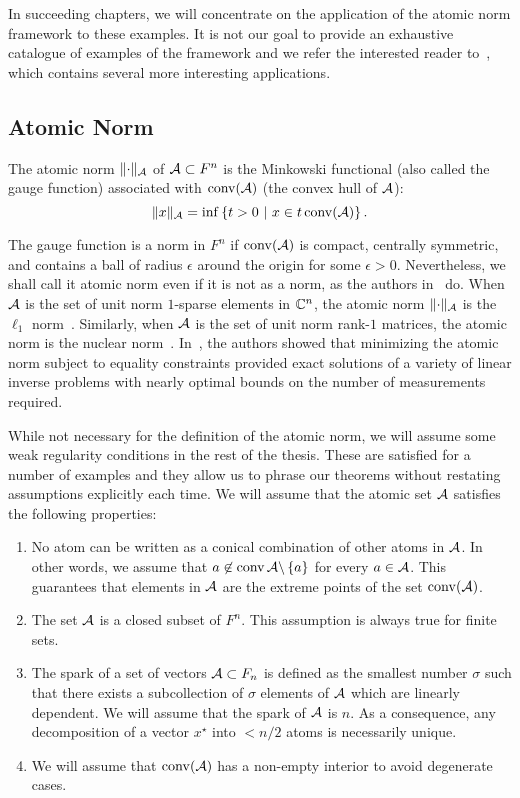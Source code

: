 In succeeding chapters, we will concentrate on the application of the atomic
norm framework to these examples. It is not our goal to provide an exhaustive
catalogue of examples of the framework and we refer the interested reader
to~\cite{crpw}, which contains several more interesting applications.

\subsection{Atomic Norm}

\begin{definition}
The atomic norm $\lVert\cdot\rVert_{\mathcal{A}}$ of $\mathcal{A} \subset F^n$ is the Minkowski
functional (also called the gauge function) associated with $\operatorname{conv}(\mathcal{A})$ (the
convex hull of $\mathcal{A}$):
\begin{equation}
	\label{defatnorm} \lVert x\rVert_{\mathcal{A}} = \inf\left\{t > 0 ~\middle|~ x \in t \operatorname{conv}(\mathcal{A}) \right\}. 
\end{equation}
\end{definition}

The gauge function is a norm in $F^n$ if $\operatorname{conv}(\mathcal{A})$ is compact, centrally
symmetric, and contains a ball of radius $\epsilon$ around the origin for some
$\epsilon>0$. Nevertheless, we shall call it atomic norm even if it is not as a
norm, as the authors in~\cite{crpw} do. When $\mathcal{A}$ is the set of unit norm
$1$-sparse elements in $\mathbb{C}^n$, the atomic norm $\lVert\cdot\rVert_{\mathcal{A}}$ is the
$\ell_1$ norm~\cite{candes06}. Similarly, when $\mathcal{A}$ is the set of unit norm
rank-$1$ matrices, the atomic norm is the nuclear norm~\cite{Recht10}.
In~\cite{crpw}, the authors showed that minimizing the atomic norm subject to
equality constraints provided exact solutions of a variety of linear inverse
problems with nearly optimal bounds on the number of measurements required.

While not necessary for the definition of the atomic norm, we will assume some
weak regularity conditions in the rest of the thesis. These are satisfied for a
number of examples and they allow us to phrase our theorems without restating
assumptions explicitly each time. We will assume that the atomic set $\mathcal{A}$ satisfies the following properties:
\begin{enumerate}
	\item No atom can be written as a conical combination of other atoms in 		$\mathcal{A}$. In other words, we assume that $ a \not\in \operatorname{conv}{\mathcal{A} \backslash \left\{ a \right\}}$ for every $a \in \mathcal{A}$. This guarantees that elements in $\mathcal{A}$ are the extreme points of the set $\operatorname{conv}(\mathcal{A})$.
	\item The set $\mathcal{A}$ is a closed subset of $F^n$. This assumption is always true for finite sets.
	\item The spark of a set of vectors $\mathcal{A} \subset F_n$ is defined as the smallest number $\sigma$ such that there exists a subcollection of $\sigma$ elements of $\mathcal{A}$ which are linearly dependent. We will assume that the spark of $\mathcal{A}$ is $n$. As a consequence, any decomposition of a vector $x^\star$ into $<n/2$ atoms is necessarily unique.~\cite{spark}
	\item We will assume that $\operatorname{conv}(\mathcal{A})$ has a non-empty interior to avoid degenerate cases.
\end{enumerate}


